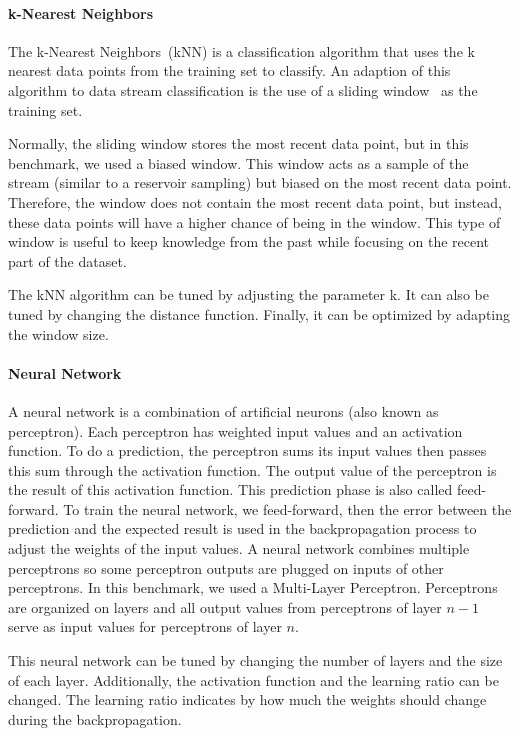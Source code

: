 \paragraph{k-Nearest Neighbors~\cite{biased_reservoir_sampling}}
The k-Nearest Neighbors~(kNN) is a classification
algorithm that uses the k nearest data points from
the training set to classify.  An adaption of this
algorithm to data stream classification is the use
of a sliding window~\cite{Mining_Massive_Datasets}
as the training set.

Normally, the sliding window stores the most
recent data point, but in this benchmark, we used
a biased window. This window acts as a sample of
the stream (similar to a reservoir sampling) but
biased on the most recent data point.  Therefore,
the window does not contain the most recent data
point, but instead, these data points will have a
higher chance of being in the window.  This type
of window is useful to keep knowledge from the
past while focusing on the recent part of the
dataset.

The kNN algorithm can be tuned by adjusting the
parameter k. It can also be tuned by changing the
distance function. Finally, it can be optimized by
adapting the window size.

\paragraph{Neural Network}
A neural network is a combination of artificial
neurons (also known as perceptron). Each
perceptron has weighted input values and an
activation function. To do a prediction, the
perceptron sums its input values then passes this
sum through the activation function. The output
value of the perceptron is the result of this
activation function. This prediction phase is also
called feed-forward.  To train the neural network,
we feed-forward, then the error between the
prediction and the expected result is used in the
backpropagation process to adjust the weights of
the input values.  A neural network combines
multiple perceptrons so some perceptron outputs
are plugged on inputs of other perceptrons.  In
this benchmark, we used a Multi-Layer Perceptron.
Perceptrons are organized on layers and all output
values from perceptrons of layer $n-1$ serve as
input values for perceptrons of layer $n$. 

This neural network can be tuned by changing the
number of layers and the size of each layer.
Additionally, the activation function and the
learning ratio can be changed. The learning ratio
indicates by how much the weights should change
during the backpropagation.

